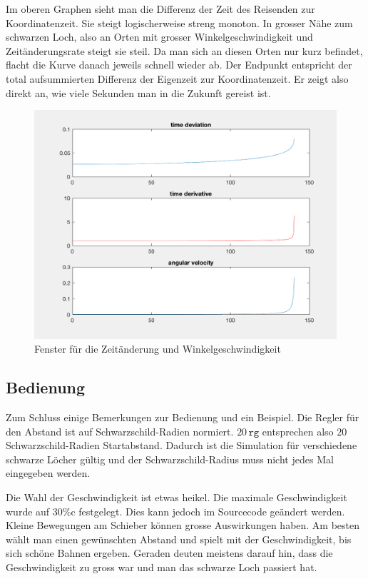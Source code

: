 \begin{refsection}
    Im oberen Graphen sieht man die Differenz der Zeit des Reisenden zur Koordinatenzeit. Sie steigt logischerweise streng monoton. In grosser Nähe zum schwarzen Loch, also an Orten mit grosser Winkelgeschwindigkeit und Zeitänderungsrate steigt sie steil. Da man sich an diesen Orten nur kurz befindet, flacht die Kurve danach jeweils schnell wieder ab. Der Endpunkt entspricht der total aufsummierten Differenz der Eigenzeit zur Koordinatenzeit. Er zeigt also direkt an, wie viele Sekunden man in die Zukunft gereist ist.
      \begin{figure}
        \centering
        \includegraphics[width=12cm]{zeitreisen/time.png}
        \caption{Fenster für die Zeitänderung und Winkelgeschwindigkeit}
        \label{skript:zeitreisen:fig:time} 
    \end{figure}
    
    \subsection{Bedienung}
    
    Zum Schluss einige Bemerkungen zur Bedienung und ein Beispiel. 
    Die Regler für den Abstand ist auf Schwarzschild-Radien normiert. $20\,\texttt{rg}$ entsprechen also $20$ Schwarzschild-Radien Startabstand. Dadurch ist die Simulation für verschiedene schwarze Löcher gültig und der Schwarzschild-Radius muss nicht jedes Mal eingegeben werden.
    
    Die Wahl der Geschwindigkeit ist etwas heikel. Die maximale Geschwindigkeit wurde auf 30\%c festgelegt. Dies kann jedoch im Sourcecode geändert werden. Kleine Bewegungen am Schieber können grosse Auswirkungen haben. Am besten wählt man einen gewünschten Abstand und spielt mit der Geschwindigkeit, bis sich schöne Bahnen ergeben. Geraden deuten meistens darauf hin, dass die Geschwindigkeit zu gross war und man das schwarze Loch passiert hat.
    

\end{refsection}
